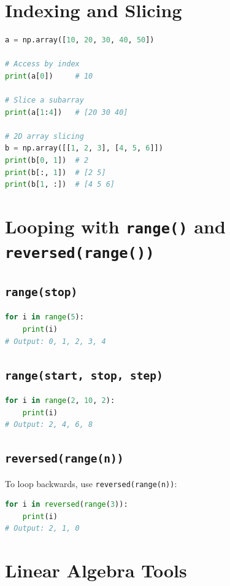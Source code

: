 \documentclass{article}
\begin{document}
\section{Indexing and Slicing}
\begin{lstlisting}[language=Python]
a = np.array([10, 20, 30, 40, 50])

# Access by index
print(a[0])     # 10

# Slice a subarray
print(a[1:4])   # [20 30 40]

# 2D array slicing
b = np.array([[1, 2, 3], [4, 5, 6]])
print(b[0, 1])  # 2
print(b[:, 1])  # [2 5]
print(b[1, :])  # [4 5 6]
\end{lstlisting}

\section{Looping with \texttt{range()} and \texttt{reversed(range())}}

\subsection*{\texttt{range(stop)}}
\begin{lstlisting}[language=Python]
for i in range(5):
    print(i)
# Output: 0, 1, 2, 3, 4
\end{lstlisting}

\subsection*{\texttt{range(start, stop, step)}}
\begin{lstlisting}[language=Python]
for i in range(2, 10, 2):
    print(i)
# Output: 2, 4, 6, 8
\end{lstlisting}

\subsection*{\texttt{reversed(range(n))}}
To loop backwards, use \texttt{reversed(range(n))}:
\begin{lstlisting}[language=Python]
for i in reversed(range(3)):
    print(i)
# Output: 2, 1, 0
\end{lstlisting}

\section{Linear Algebra Tools}
\end{document}
